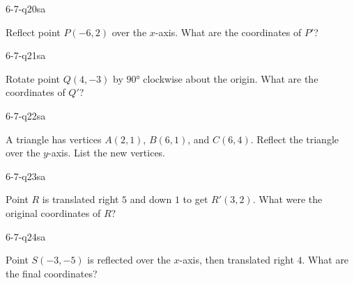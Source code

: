 \begin{practiceQuestion}{6-7-q20}{sa}
\begin{questionText}
Reflect point $P(-6, 2)$ over the $x$-axis. What are the coordinates of $P'$?
\end{questionText}
\end{practiceQuestion}

\begin{practiceQuestion}{6-7-q21}{sa}
\begin{questionText}
Rotate point $Q(4, -3)$ by $90°$ clockwise about the origin. What are the coordinates of $Q'$?
\end{questionText}
\end{practiceQuestion}

\begin{practiceQuestion}{6-7-q22}{sa}
\begin{questionText}
A triangle has vertices $A(2, 1)$, $B(6, 1)$, and $C(6, 4)$. Reflect the triangle over the $y$-axis. List the new vertices.
\end{questionText}
\end{practiceQuestion}

\begin{practiceQuestion}{6-7-q23}{sa}
\begin{questionText}
Point $R$ is translated right $5$ and down $1$ to get $R'(3, 2)$. What were the original coordinates of $R$?
\end{questionText}
\end{practiceQuestion}

\begin{practiceQuestion}{6-7-q24}{sa}
\begin{questionText}
Point $S(-3, -5)$ is reflected over the $x$-axis, then translated right $4$. What are the final coordinates?
\end{questionText}
\end{practiceQuestion}

